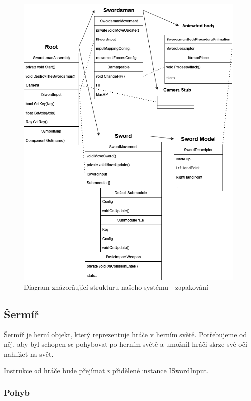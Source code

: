 \begin{figure}[p]\centering
  \center
  \includegraphics[width=145mm]{../img/Structure-diagram.png}
  \caption{Diagram znázorňující strukturu našeho systému - zopakování}
  \label{obr05:objectModelDiagramReprise}
\end{figure} 

\pagebreak

\subsection{Šermíř}

Šermíř je herní objekt, který reprezentuje hráče v herním světě. Potřebujeme od něj, aby byl schopen se pohybovat po herním světě a umožnil hráči skrze své oči nahlížet na svět. 

Instrukce od hráče bude přejímat z přidělené instance ISwordInput.

\subsubsection*{Pohyb}


